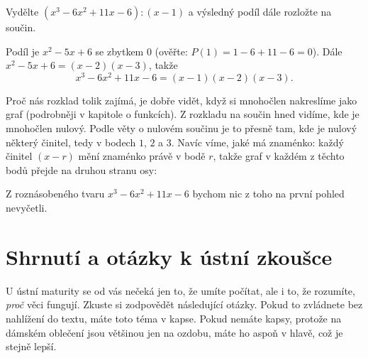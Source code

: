\begin{problem}
  Vydělte $(x^3 - 6x^2 + 11x - 6) : (x - 1)$ a výsledný podíl dále rozložte na součin.
\end{problem}

\begin{solution}
  Podíl je $x^2 - 5x + 6$ se zbytkem $0$ (ověřte: $P(1) = 1 - 6 + 11 - 6 = 0$). Dále $x^2 - 5x + 6 = (x - 2)(x - 3)$, takže
  \begin{equation*}
    x^3 - 6x^2 + 11x - 6 = (x - 1)(x - 2)(x - 3).
  \end{equation*}
\end{solution}

Proč nás rozklad tolik zajímá, je dobře vidět, když si mnohočlen nakreslíme jako graf (podrobněji v kapitole o funkcích). Z rozkladu na součin hned vidíme, kde je mnohočlen nulový. Podle věty o nulovém součinu je to přesně tam, kde je nulový některý činitel, tedy v bodech $1$, $2$ a $3$. Navíc víme, jaké má znaménko: každý činitel $(x - r)$ mění znaménko právě v bodě $r$, takže graf v každém z těchto bodů přejde na druhou stranu osy:
\begin{center}
\end{center}
Z roznásobeného tvaru $x^3 - 6x^2 + 11x - 6$ bychom nic z toho na první pohled nevyčetli.

\section{Shrnutí a otázky k ústní zkoušce}

U ústní maturity se od vás nečeká jen to, že umíte počítat, ale i to, že rozumíte, \textit{proč} věci fungují. Zkuste si zodpovědět následující otázky. Pokud to zvládnete bez nahlížení do textu, máte toto téma v kapse. Pokud nemáte kapsy, protože na dámském oblečení jsou většinou jen na ozdobu, máte ho aspoň v hlavě, což je stejně lepší.

